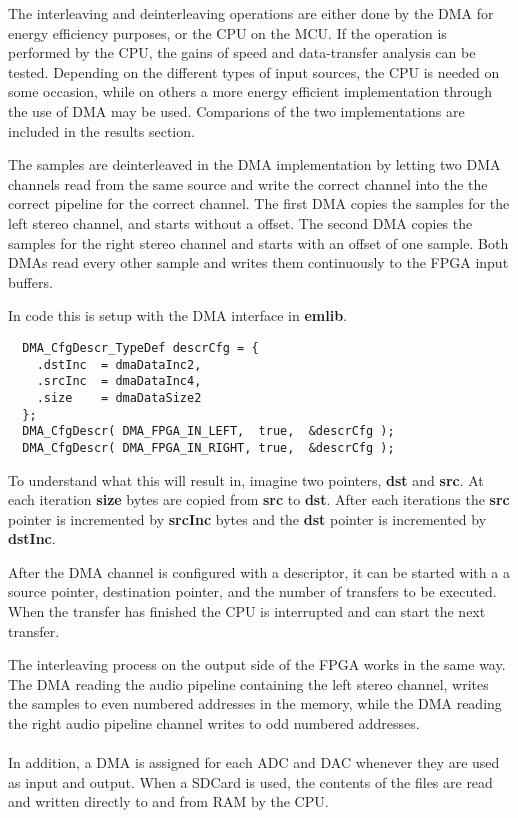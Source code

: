 The interleaving and deinterleaving operations are either done by the DMA for
energy efficiency purposes, or the CPU on the MCU. If the operation is performed
by the CPU, the gains of speed and data-transfer analysis can be tested. Depending
on the different types of input sources, the CPU is needed on some occasion, while
on others a more energy efficient implementation through the use of DMA may be used.
Comparions of the two implementations are included in the results section.

The samples are deinterleaved in the DMA implementation by letting two DMA channels read from the
same source and write the correct channel into the the correct pipeline for the correct channel.
The first DMA copies the samples for the left stereo channel, and starts without a offset. The
second DMA copies the samples for the right stereo channel and starts with an
offset of one sample. Both DMAs read every other sample and writes them
continuously to the FPGA input buffers.

In code this is setup with the DMA interface in {\bf emlib}.

\begin{lstlisting}
  DMA_CfgDescr_TypeDef descrCfg = {
    .dstInc  = dmaDataInc2,
    .srcInc  = dmaDataInc4,
    .size    = dmaDataSize2
  };
  DMA_CfgDescr( DMA_FPGA_IN_LEFT,  true,  &descrCfg );
  DMA_CfgDescr( DMA_FPGA_IN_RIGHT, true,  &descrCfg );
\end{lstlisting}
To understand what this will result in, imagine two pointers, {\bf dst} and {\bf src}.
At each iteration {\bf size} bytes are copied from {\bf src} to {\bf dst}. After each
iterations the {\bf src} pointer is incremented by {\bf srcInc} bytes and the {\bf dst}
pointer is incremented by {\bf dstInc}.

After the DMA channel is configured with a descriptor, it can be started with a
a source pointer, destination pointer, and the number of transfers to be executed.
When the transfer has finished the CPU is interrupted and can start the next transfer.

The interleaving process on the output side of the FPGA works in the same way. The DMA reading
the audio pipeline containing the left stereo channel, writes the samples to even numbered
addresses in the memory, while the DMA reading the right audio pipeline channel writes
to odd numbered addresses.

\paragraph*{}
In addition, a DMA is assigned for each ADC and DAC whenever they are used as
input and output. When a SDCard is used, the contents of the files are read and
written directly to and from RAM by the CPU.

